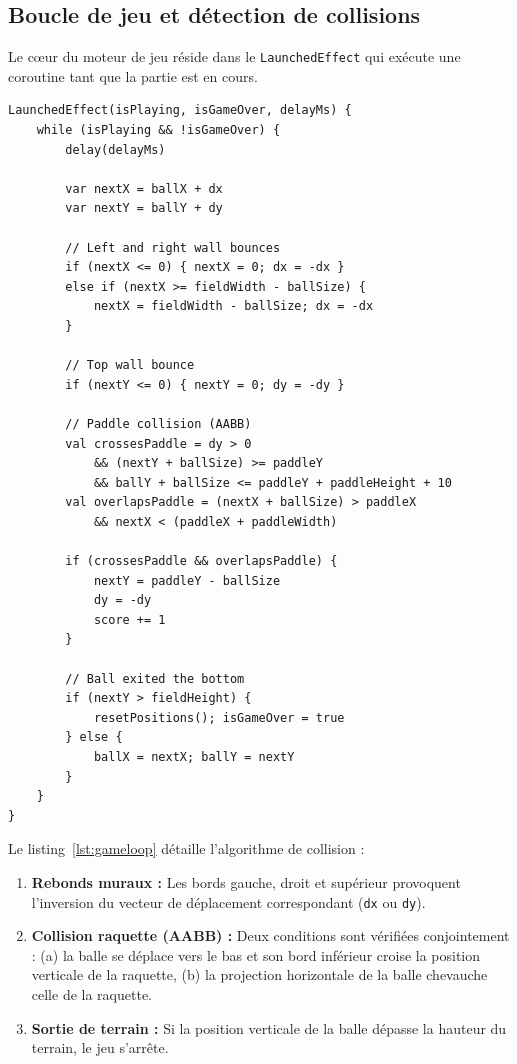 \documentclass[12pt,a4paper]{report}
\begin{document}
\subsection{Boucle de jeu et d\'etection de collisions}
Le c\oe{}ur du moteur de jeu r\'eside dans le \texttt{LaunchedEffect} qui ex\'ecute une coroutine tant que la partie est en cours.

\begin{lstlisting}[caption={Boucle de jeu principale avec gestion des collisions}, label=lst:gameloop]
LaunchedEffect(isPlaying, isGameOver, delayMs) {
    while (isPlaying && !isGameOver) {
        delay(delayMs)

        var nextX = ballX + dx
        var nextY = ballY + dy

        // Left and right wall bounces
        if (nextX <= 0) { nextX = 0; dx = -dx }
        else if (nextX >= fieldWidth - ballSize) {
            nextX = fieldWidth - ballSize; dx = -dx
        }

        // Top wall bounce
        if (nextY <= 0) { nextY = 0; dy = -dy }

        // Paddle collision (AABB)
        val crossesPaddle = dy > 0
            && (nextY + ballSize) >= paddleY
            && ballY + ballSize <= paddleY + paddleHeight + 10
        val overlapsPaddle = (nextX + ballSize) > paddleX
            && nextX < (paddleX + paddleWidth)

        if (crossesPaddle && overlapsPaddle) {
            nextY = paddleY - ballSize
            dy = -dy
            score += 1
        }

        // Ball exited the bottom
        if (nextY > fieldHeight) {
            resetPositions(); isGameOver = true
        } else {
            ballX = nextX; ballY = nextY
        }
    }
}
\end{lstlisting}

Le listing~\ref{lst:gameloop} d\'etaille l'algorithme de collision :
\begin{enumerate}
    \item \textbf{Rebonds muraux :} Les bords gauche, droit et sup\'erieur provoquent l'inversion du vecteur de d\'eplacement correspondant (\texttt{dx} ou \texttt{dy}).
    \item \textbf{Collision raquette (AABB) :} Deux conditions sont v\'erifi\'ees conjointement : (a) la balle se d\'eplace vers le bas et son bord inf\'erieur croise la position verticale de la raquette, (b) la projection horizontale de la balle chevauche celle de la raquette.
    \item \textbf{Sortie de terrain :} Si la position verticale de la balle d\'epasse la hauteur du terrain, le jeu s'arr\^ete.
\end{enumerate}
\end{document}
